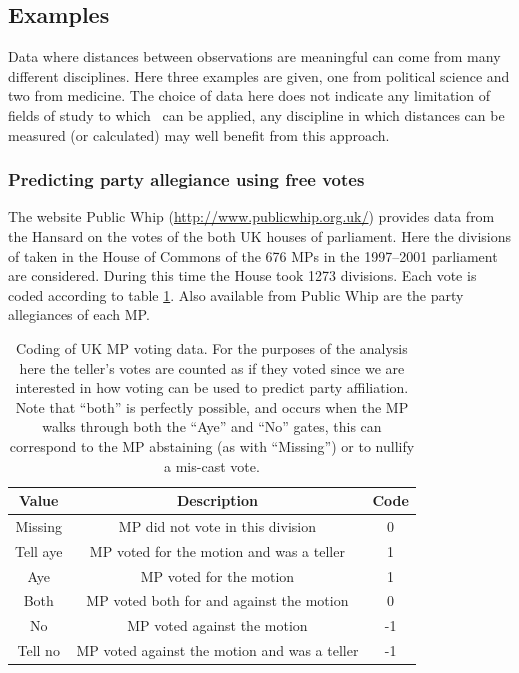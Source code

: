 \subsection{Examples}
\label{gds-examples}

Data where distances between observations are meaningful can come from many different disciplines. Here three examples are given, one from political science and two from medicine. The choice of data here does not indicate any limitation of fields of study to which \mdsds\ can be applied, any discipline in which distances can be measured (or calculated) may well benefit from this approach.

\subsubsection{Predicting party allegiance using free votes}

The website Public Whip (\url{http://www.publicwhip.org.uk/}) provides data from the Hansard on the votes of the both UK houses of parliament. Here the divisions of taken in the House of Commons of the 676 MPs in the 1997--2001 parliament are considered. During this time the House took 1273 divisions. Each vote is coded according to table \ref{voting-code}. Also available from Public Whip are the party allegiances of each MP. 

\begin{table}  
\begin{centering}
\begin{tabular}{ccc}
    Value & Description & Code \\ 
    \hline
    Missing & MP did not vote in this division & 0 \\ 
    Tell aye & MP voted for the motion and was a teller & 1 \\ 
    Aye & MP voted for the motion & 1 \\ 
    Both & MP voted both for  and against the motion & 0 \\ 
    No & MP voted against the motion & -1 \\ 
    Tell no & MP voted against the motion and was a teller & -1 \\ 
  \end{tabular}
\caption{Coding of UK MP voting data. For the purposes of the analysis here the teller's votes are counted as if they voted since we are interested in how voting can be used to predict party affiliation. Note that ``both'' is perfectly possible, and occurs when the MP walks through both the ``Aye'' and ``No'' gates, this can correspond to the MP abstaining (as with ``Missing'') or to nullify a mis-cast vote.}
\label{voting-code}
\end{centering}
\end{table}

